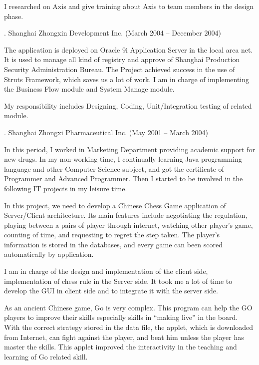 I researched on Axis and give training about Axis to team members in the design phase. 

. Shanghai Zhongxin Development Inc. (March 2004 -- December 2004)\par

\noindent
The application is deployed on Oracle 9i Application Server in the local area net. 
It is used to manage all kind of  registry and approve of Shanghai Production 
Security Administration Bureau. The Project achieved success in the use of Struts 
Framework, which saves us a lot of work. I am in charge of implementing the 
Business Flow module and System Manage module. 

My responsibility includes Designing, Coding, Unit/Integration testing of related module. 

. Shanghai Zhongxi Pharmaceutical Inc. (May 2001 -- March 2004)\par

\noindent
In this period, I worked in Marketing Department providing academic support for new drugs. 
In my non-working time, I continually learning Java programming language 
and other Computer Science subject, and got the certificate of Programmer 
and Advanced Programmer. Then I started to be involved in the following 
IT projects in my leisure time.


In this project, we need to develop a Chinese Chess Game application 
of Server/Client architecture. Its main features include negotiating 
the regulation, playing between a pairs of player through internet, 
watching other player's game, counting of time, and requesting to regret
 the step taken. The player's information is stored in the databases,
  and every game can been scored automatically by application. 

I am in charge of the design and implementation of the client side, 
implementation of chess rule in the Server side. It took me a lot of 
time to develop the GUI in client side and to integrate it with the
 server side. 


As an ancient Chinese game, Go is very complex. This program can help the
GO players to improve their skills especially skills in ``making live'' 
in the board. With
the correct strategy stored in the data file, the applet, which is
 downloaded from Internet, can fight against the player, and beat him 
 unless the player has master the skills. This applet improved the 
 interactivity in the teaching and learning of Go related skill. 

